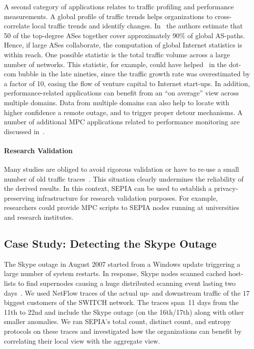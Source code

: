 \documentclass[letterpaper,11pt,onecolumn,titlepage]{article}
\begin{document}
A second category of applications relates to traffic profiling and
performance measurements. A global profile of traffic trends helps
organizations to cross-correlate local traffic trends and identify
changes. In~\cite{sekar2004tfi} the authors estimate that 50 of the
top-degree ASes together cover approximately 90\% of global AS-paths.
Hence, if large ASes collaborate, the computation of global Internet
statistics is within reach. One possible statistic is the total
traffic volume across a large number of networks. This statistic, for
example, could have helped~\cite{roughan2006sdd} in the dot-com bubble
in the late nineties, since the traffic growth rate was overestimated
by a factor of 10, easing the flow of venture capital to Internet
start-ups. In addition, performance-related applications can benefit
from an ``on average'' view across multiple domains. Data from
multiple domains can also help to locate with higher confidence a
remote outage, and to trigger proper detour mechanisms. A number of
additional MPC applications related to performance monitoring are
discussed in~\cite{roughan2006ppp}.

\paragraph{Research Validation}

Many studies are obliged to avoid rigorous validation or have to
re-use a small number of old traffic
traces~\cite{claffy2006con,slagell2005scn}.  This situation clearly
undermines the reliability of the derived results. In this context,
SEPIA can be used to establish a privacy-preserving infrastructure for
research validation purposes. For example, researchers could provide
MPC scripts to SEPIA nodes running at universities and research
institutes.


\subsection{Case Study: Detecting the Skype Outage}
\label{sec:casestudy}



The Skype outage in August 2007 started from a
Windows update triggering a large number of system restarts. In
response, Skype nodes scanned cached host-lists to find
supernodes causing a huge distributed scanning event lasting two
days~\cite{rossi2009understanding}. We used NetFlow traces of the actual up- and downstream traffic 
of the $17$ biggest customers of the SWITCH network. The traces span~11 days from the 11th to 22nd and include
the Skype outage (on the 16th/17th) along with other smaller
anomalies. We ran SEPIA's total count, distinct count, and entropy 
protocols on these traces and investigated how the organizations can
benefit by correlating their local view with the aggregate view.
\end{document}
